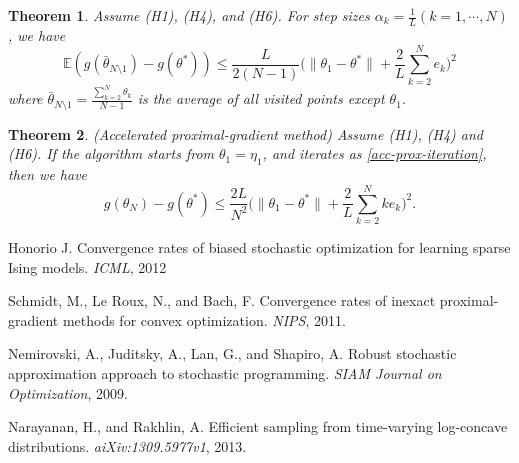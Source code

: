 \documentclass[psamsfonts]{article}
\newtheorem{thm}{Theorem} %
\theoremstyle{definition}
\theoremstyle{remark}
\numberwithin{equation} {section}
\begin{document}
\begin{thm}
Assume (H1), (H4), and (H6). For step sizes $\alpha_k = \frac{1}{L}(k = 1, \cdots, N)$, we have
\begin{equation}\label{basic-prox-expect-bound}
\mathbb E(g(\bar{\theta}_{N\setminus 1}) - g(\theta^*)) \le \frac{L}{2(N-1)}\big(\|\theta_1 - \theta^* \| + \frac{2}{L} \sum_{k=2}^{N} e_k\big)^2
\end{equation}
where $\bar{\theta}_{N\setminus 1} = \frac{\sum_{k=2}^N \theta_k}{N-1}$ is the average of all visited points except $\theta_1$.
\end{thm}

\begin{thm}(Accelerated proximal-gradient method)
Assume (H1), (H4) and (H6). If the algorithm starts from $\theta_1 = \eta_1$, and iterates as \eqref{acc-prox-iteration}, then we have
\begin{equation}\label{acc-prox-expect-bound}
g(\theta_N) - g(\theta^*) \le \frac{2L}{N^2}\big( \|\theta_1 - \theta^* \|+ \frac{2}{L}\sum_{k=2}^{N} k e_k\big)^2.
\end{equation}
\end{thm}




\begin{thebibliography}{9}

Honorio J.
Convergence rates of biased stochastic optimization for learning sparse Ising models.
\emph{ICML}, 2012

Schmidt, M., Le Roux, N., and Bach, F.
Convergence rates of inexact proximal-gradient methods for convex optimization.
\emph{NIPS}, 2011.

Nemirovski, A., Juditsky, A., Lan, G., and Shapiro, A.
Robust stochastic approximation approach to stochastic programming.
\emph{SIAM Journal on Optimization}, 2009.

Narayanan, H., and Rakhlin, A.
Efficient sampling from time-varying log-concave distributions.
\emph{aiXiv:1309.5977v1}, 2013.

\end{thebibliography}
\end{document}
